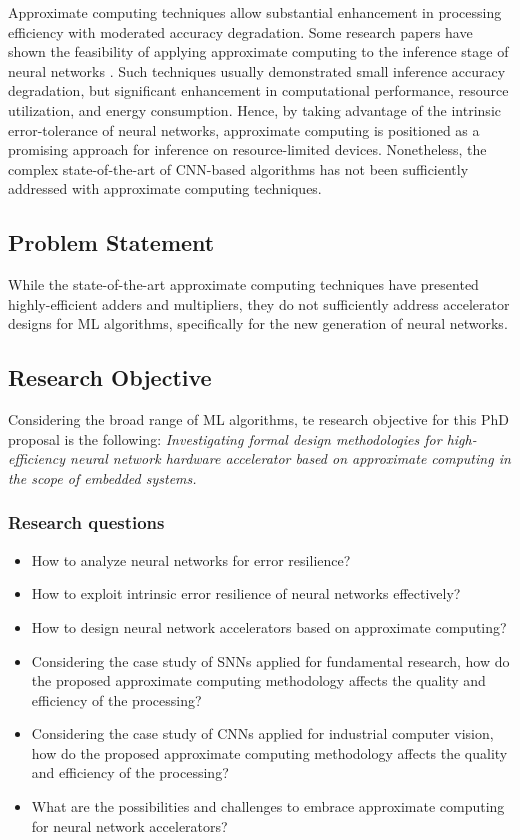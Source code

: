 Approximate computing techniques allow substantial enhancement in processing efficiency with moderated accuracy degradation. Some research papers have shown the feasibility of applying approximate computing to the inference stage of neural networks \cite{lotrivc2012applicability, han2013approximate, du2014leveraging, mrazek2016design, sarwar2016multiplier, zervakis2021approximate}. Such techniques usually demonstrated small inference accuracy degradation, but significant enhancement in computational performance, resource utilization, and energy consumption. Hence, by taking advantage of the intrinsic error-tolerance of neural networks, approximate computing is positioned as a promising approach for inference on resource-limited devices. Nonetheless, the complex  state-of-the-art of CNN-based algorithms has not been sufficiently addressed with approximate computing techniques.


\subsection{Problem Statement}

While the state-of-the-art approximate computing techniques have presented highly-efficient adders and multipliers, they do not sufficiently address accelerator designs for ML algorithms, specifically for the new generation of neural networks.

\subsection{Research Objective}
Considering the broad range of ML algorithms, te research objective for this PhD proposal is the following: \emph{Investigating formal design methodologies for high-efficiency neural network hardware accelerator based on approximate computing in the scope of embedded systems.}

\subsubsection{Research questions}

\begin{itemize}
\item How to analyze neural networks for error resilience?
\item How to exploit intrinsic error resilience of neural networks effectively?
\item How to design neural network accelerators based on approximate computing?
\item Considering the case study of SNNs applied for fundamental research, how do the proposed approximate computing methodology affects the quality and efficiency of the processing?
\item Considering the case study of CNNs applied for industrial computer vision, how do the proposed approximate computing methodology affects the quality and efficiency of the processing?
\item What are the possibilities and challenges to embrace approximate computing for neural network accelerators?

\end{itemize}

